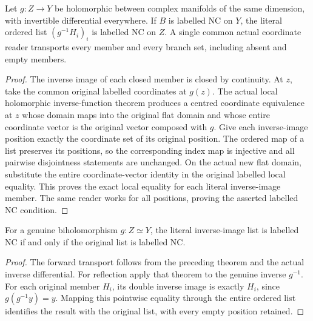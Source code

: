 \begin{theorem}
\label{hir:labelled-nc-whole-local-biholomorphic-pullback}
\leanok
Let $g:Z\to Y$ be holomorphic between complex manifolds of the same
dimension, with invertible differential everywhere. If $B$ is labelled
NC on $Y$, the literal ordered list $(g^{-1}H_i)_i$ is labelled NC on
$Z$. A single common actual coordinate reader transports every member
and every branch set, including absent and empty members.
\end{theorem}
\begin{proof}
The inverse image of each closed member is closed by continuity. At
$z$, take the common original labelled coordinates at $g(z)$. The
actual local holomorphic inverse-function theorem produces a centred
coordinate equivalence at $z$ whose domain maps into the original
flat domain and whose entire coordinate vector is the original vector
composed with $g$. Give each inverse-image position exactly the
coordinate set of its original position. The ordered map of a list
preserves its positions, so the corresponding index map is injective
and all pairwise disjointness statements are unchanged. On the actual
new flat domain, substitute the entire coordinate-vector identity in
the original labelled local equality. This proves the exact local
equality for each literal inverse-image member. The same reader works
for all positions, proving the asserted labelled NC condition.
\end{proof}

\begin{corollary}
\label{hir:labelled-nc-biholomorphic-equivalence}
\leanok
For a genuine biholomorphism $g:Z\simeq Y$, the literal inverse-image
list is labelled NC if and only if the original list is labelled NC.
\end{corollary}
\begin{proof}
The forward transport follows from the preceding theorem and the
actual inverse differential. For reflection apply that theorem to the
genuine inverse $g^{-1}$. For each original member $H_i$, its double
inverse image is exactly $H_i$, since $g(g^{-1}y)=y$. Mapping this
pointwise equality through the entire ordered list identifies the
result with the original list, with every empty position retained.
\end{proof}

